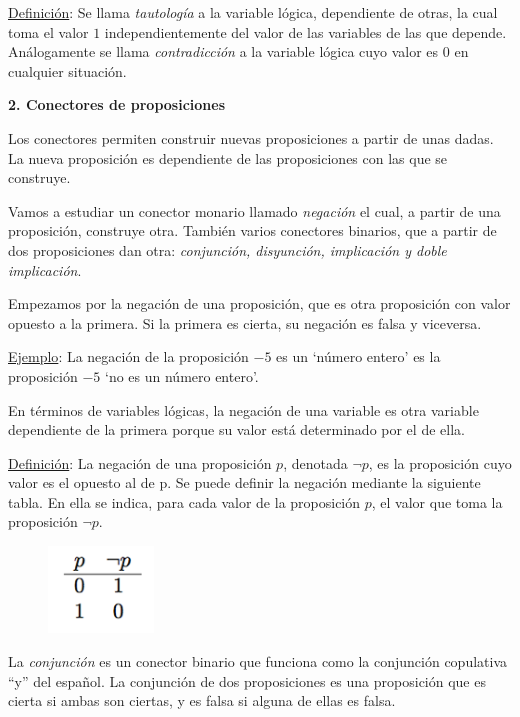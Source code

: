 \underline{Definición}:  Se llama \emph{tautología} a la variable lógica, dependiente de otras, la cual toma el valor $1$ independientemente del valor de las variables de las que depende. Análogamente se llama \emph{contradicción} a la variable lógica cuyo valor es $0$ en cualquier situación.

\vspace{5mm}\textbf{2. Conectores de proposiciones}

Los conectores permiten construir nuevas proposiciones a partir de unas dadas. La nueva proposición es dependiente de las proposiciones con las que se construye.

Vamos a estudiar un conector monario llamado \emph{negación} el cual, a partir de una proposición, construye otra. También varios conectores binarios, que a partir de dos proposiciones dan otra: \emph{conjunción, disyunción, implicación y doble implicación}. 

Empezamos por la negación de una proposición, que es otra proposición con valor opuesto a la primera. Si la primera es cierta, su negación es falsa y viceversa.

\underline{Ejemplo}: La negación de la proposición $-5$ es un `número entero' es la proposición $-5$ `no es un número entero'.

En términos de variables lógicas, la negación de una variable es otra variable dependiente de la primera porque su valor está determinado por el de ella. 

\begin{multicols}{2}
\underline{Definición}: La negación de una proposición $p$, denotada  $\neg p$, es la proposición cuyo valor es el opuesto al de p. Se puede definir la negación mediante la siguiente tabla. En ella se indica, para cada valor de la proposición $p$, el valor que toma la proposición $\neg p$.

\begin{figure}[H] 
		\centering
		\includegraphics[width=0.25\textwidth]{imagenes/apendices/APENDICESIM13.png}
	\end{figure}
\end{multicols}


La \emph{conjunción} es un conector binario que funciona como la conjunción copulativa ``y'' del español. La conjunción de dos proposiciones es una proposición que es cierta si ambas son ciertas, y es falsa si alguna de ellas es falsa. 


